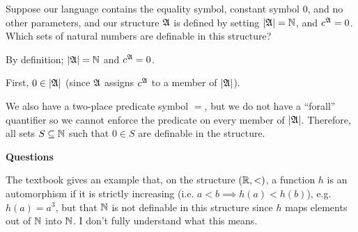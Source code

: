 \documentclass[english, 12pt]{amsart}
\begin{document}
\setlength{\headheight}{13.0pt}
\setlength{\footskip}{15.0pt}



\begin{problem}
  Suppose our language contains the equality symbol,
  constant symbol $0$, and no other parameters,
  and our structure $\mathfrak{A}$ is defined by setting $\lvert\mathfrak{A}\rvert = \mathbb{N}$,
  and $c^{\mathfrak{A}} = 0$.
  Which sets of natural numbers are definable in this structure?

  \begin{Answer}
    By definition;
    $\lvert\mathfrak{A}\rvert = \mathbb{N}$ and
    $c^{\mathfrak{A}} = 0$.
    
    \step
    First, $0 \in \lvert\mathfrak{A}\rvert$ (since $\mathfrak{A}$ assigns
    $c^{\mathfrak{A}}$ to a member of $\lvert\mathfrak{A}\rvert$).

    \step
    We also have a two-place predicate symbol $=$,
    but we do not have a ``forall'' quantifier so we cannot
    enforce the predicate on every member of $\lvert\mathfrak{A}\rvert$.
    Therefore, all sets $S \subseteq \mathbb{N}$ such that $0 \in S$ are
    definable in the structure.
  \end{Answer}
\end{problem}

\step
  \begin{center}\textbf{Questions} \end{center}

  \step
  The textbook gives an example that, on the structure
  $(\mathbb{R}, <)$, a function $h$ is an automorphism if it is strictly increasing
  (i.e. $a < b \implies h(a) < h(b)$),
  e.g. $h(a) = a^3$,
  but that $\mathbb{N}$ is not definable in this structure since
  $h$ maps elements out of $\mathbb{N}$ into $\mathbb{N}$.
  I don't fully understand what this means.
\bigskip
\end{document}
